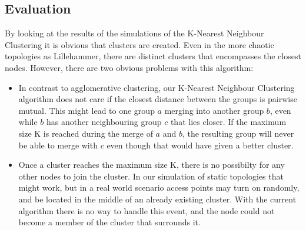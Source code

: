 %
%
\subsection{Evaluation}
By looking at the results of the simulations of the K-Nearest Neighbour Clustering it is obvious that clusters are created.  Even in the more chaotic topologies as Lillehammer,
there are distinct clusters that encompasses the closest nodes. However, there are two obvious problems with this algorithm:
\begin{itemize}
	\item In contrast to agglomerative clustering, our K-Nearest Neighbour Clustering algorithm does not care if the closest distance between the groups is pairwise mutual. This
		might lead to one group $a$ merging into another group $b$, even while $b$ has another neighbouring group $c$ that lies closer. If the maximum size K is reached during the merge of
		$a$ and $b$,  the resulting group will never be able to merge with $c$ even though that would have given a better cluster. 
	\item Once a cluster reaches the maximum size K, there is no possibilty for any other nodes to join the cluster.
		In our simulation of static topologies that might work, but in a real world scenario access points may turn on randomly, and be located in the middle of an already existing cluster.
		With the current algorithm there is no way to handle this event, and the node could not become a member of the cluster that surrounds it. 
\end{itemize}

